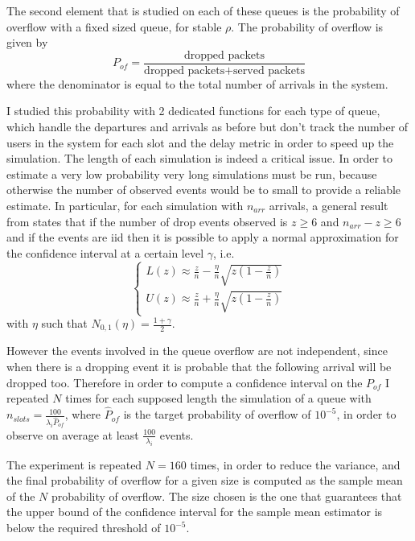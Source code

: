 \documentclass[10pt]{article}
\begin{document}
The second element that is studied on each of these queues is the probability of overflow with a fixed sized queue, for stable $\rho$. The probability of overflow is given by 
\begin{equation}
  P_{of} = \frac{\mbox{dropped packets}}{\mbox{dropped packets} + \mbox{served packets}}
\end{equation}
where the denominator is equal to the total number of arrivals in the system. 

I studied this probability with 2 dedicated functions for each type of queue, which handle the departures and arrivals as before but don't track the number of users in the system for each slot and the delay metric in order to speed up the simulation. The length of each simulation is indeed a critical issue. In order to estimate a very low probability very long simulations must be run, because otherwise the number of observed events would be to small to provide a reliable estimate. In particular, for each simulation with $n_{arr}$ arrivals, a general result from \cite{leb} states that if the number of drop events observed is $z \ge 6$ and $n_{arr} - z \ge 6$ and if the events are iid then it is possible to apply a normal approximation for the confidence interval at a certain level $\gamma$, i.e.
\begin{equation}
  \begin{cases}
  L(z) \approx \frac{z}{n} - \frac{\eta}{n}\sqrt{z\left(1 - \frac{z}{n}\right)} \\
  U(z) \approx \frac{z}{n} + \frac{\eta}{n}\sqrt{z\left(1 - \frac{z}{n}\right)}
  \end{cases}
\end{equation}
with $\eta$ such that $N_{0,1}(\eta) = \frac{1+\gamma}{2}$.

However the events involved in the queue overflow are not independent, since when there is a dropping event it is probable that the following arrival will be dropped too. Therefore in order to compute a confidence interval on the $P_{of}$ I repeated $N$ times for each supposed length the simulation of a queue with $n_{slots} = \frac{100}{\lambda_i \hat{P}_{of}}$, where $\hat{P}_{of}$ is the target probability of overflow of $10^{-5}$, in order to observe on average at least $\frac{100}{\lambda_i}$ events. 

The experiment is repeated $N = 160$ times, in order to reduce the variance, and the final probability of overflow for a given size is computed as the sample mean of the $N$ probability of overflow. The size chosen is the one that guarantees that the upper bound of the confidence interval for the sample mean estimator is below the required threshold of $10^{-5}$. 
\end{document}
